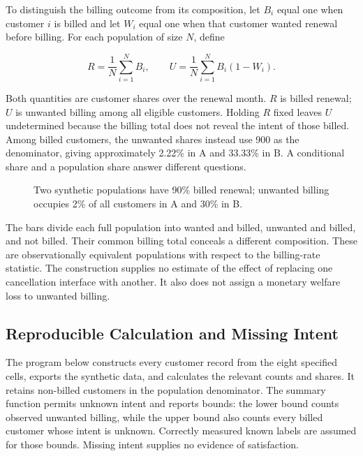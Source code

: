 To distinguish the billing outcome from its composition, let \(B_i\)
equal one when customer \(i\) is billed and let \(W_i\) equal one when
that customer wanted renewal before billing. For each population of size
\(N\), define

\[
R=\frac{1}{N}\sum_{i=1}^{N}B_i,
\qquad
U=\frac{1}{N}\sum_{i=1}^{N}B_i(1-W_i).
\]

Both quantities are customer shares over the renewal month. \(R\) is
billed renewal; \(U\) is unwanted billing among all eligible customers.
Holding \(R\) fixed leaves \(U\) undetermined because the billing total
does not reveal the intent of those billed. Among billed customers, the
unwanted shares instead use 900 as the denominator, giving approximately
2.22\% in A and 33.33\% in B. A conditional share and a population share
answer different questions.

\begin{figure}[htbp]
\centering

\caption{Two synthetic populations have 90\% billed renewal; unwanted billing occupies 2\% of all customers in A and 30\% in B.}\label{fig:M09_retention_intent}
\end{figure}

The bars divide each full population into wanted and billed, unwanted
and billed, and not billed. Their common billing total conceals a
different composition. These are observationally equivalent populations
with respect to the billing-rate statistic. The construction supplies no
estimate of the effect of replacing one cancellation interface with
another. It also does not assign a monetary welfare loss to unwanted
billing.

\hypertarget{M09-reproducible-calculation-and-missing-intent}{%
\subsection{Reproducible Calculation and Missing
Intent}\label{M09-reproducible-calculation-and-missing-intent}}

\noindent \noindent The program below constructs every customer record from the
eight specified cells, exports the synthetic data, and calculates the
relevant counts and shares. It retains non-billed customers in the
population denominator. The summary function permits unknown intent and
reports bounds: the lower bound counts observed unwanted billing, while
the upper bound also counts every billed customer whose intent is
unknown. Correctly measured known labels are assumed for those bounds.
Missing intent supplies no evidence of satisfaction.

